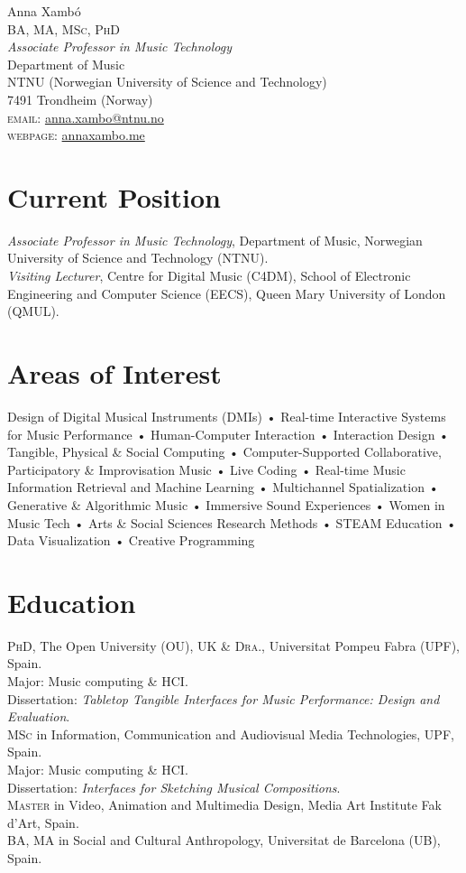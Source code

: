 \documentclass[10pt, a4paper]{article}
\newcommand{\years}[1]{\marginnote{\scriptsize #1}}
\begin{document}
{\Huge Anna Xambó}\\[0.1cm]
\textsc{BA, MA, MSc, PhD}\\[0.9cm]
\emph{Associate Professor in Music Technology}\\
Department of Music\\
NTNU (Norwegian University of Science and Technology)\\
7491 Trondheim (Norway)\\[.2cm]
\textsc{email}: \href{mailto:anna.xambo@ntnu.no}{anna.xambo@ntnu.no}\\
\textsc{webpage}: \href{http://annaxambo.me/}{annaxambo.me}\\ 

\section*{Current Position}
\emph{Associate Professor in Music Technology}, Department of Music, Norwegian University of Science and Technology (NTNU).\\
\emph{Visiting Lecturer}, Centre for Digital Music (C4DM), School of Electronic Engineering and Computer Science (EECS), Queen Mary University of London (QMUL).

\section*{Areas of Interest}
Design of Digital Musical Instruments (DMIs) • Real-time Interactive Systems for Music Performance • Human-Computer Interaction • Interaction Design • Tangible, Physical \& Social Computing • Computer-Supported Collaborative, Participatory \& Improvisation Music • Live Coding • Real-time Music Information Retrieval and Machine Learning • Multichannel Spatialization • Generative \& Algorithmic Music • Immersive Sound Experiences • Women in Music Tech • Arts \& Social Sciences Research Methods • STEAM Education • Data Visualization • Creative Programming

\section*{Education}
\noindent
\years{2015}\textsc{PhD}, The Open University (OU), UK \& \textsc{Dra.}, Universitat Pompeu Fabra (UPF), Spain.\\
Major: Music computing \& HCI.\\ 
Dissertation: \emph{Tabletop Tangible Interfaces for Music Performance: Design and Evaluation}.\\
\years{2008}\textsc{MSc} in Information, Communication and Audiovisual Media Technologies, UPF, Spain.\\
Major: Music computing \& HCI.\\ 
Dissertation: \emph{Interfaces for Sketching Musical Compositions}.\\
\years{1999}\textsc{Master} in Video, Animation and Multimedia Design, Media Art Institute Fak d'Art, Spain.\\
\years{1996}\textsc{BA, MA} in Social and Cultural Anthropology, Universitat de Barcelona (UB), Spain.
\end{document}
